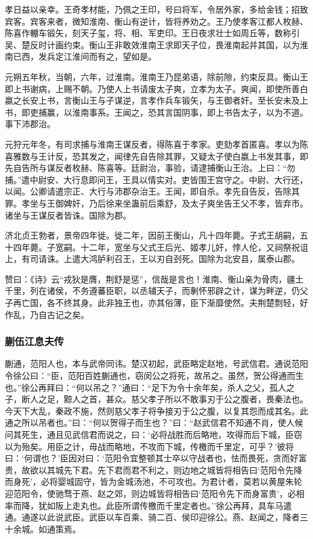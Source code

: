 \documentclass[]{article}
\begin{document}
孝日益以亲幸。王奇孝材能，乃佩之王印，号曰将军，令居外家，多给金钱；招致宾客。宾客来者，微知淮南、衡山有逆计，皆将养劝之。王乃使孝客江都人枚赫、陈喜作輣车锻矢，刻天子玺，将、相、军吏印。王日夜求壮士如周丘等，数称引吴、楚反时计画约束。衡山王非敢效淮南王求即天子位，畏淮南起并其国，以为淮南已西，发兵定江淮间而有之，望如是。

元朔五年秋，当朝，六年，过淮南。淮南王乃昆弟语，除前隙，约束反具。衡山王即上书谢病，上赐不朝。乃使人上书请废太子爽，立孝为太子。爽闻，即使所善白嬴之长安上书，言衡山王与子谋逆，言孝作兵车锻矢，与王御者奸。至长安未及上书，即吏捕赢，以淮南事系。王闻之，恐其言国阴事，即上书告太子，以为不道。事下沛郡治。

元狩元年冬，有司求捕与淮南王谋反者，得陈喜于孝家。吏劾孝首匿喜。孝以为陈喜雅数与王计反，恐其发之，闻律先自告除其罪，又疑太子使白嬴上书发其事，即先自告所与谋反者枚赫、陈喜等。廷尉治，事验，请逮捕衡山王治。上曰：``勿捕。''遣中尉安、大行息即问王，王具以情实对。吏皆围王宫守之。中尉、大行还，以闻。公卿请遣宗正、大行与沛郡杂治王。王闻，即自杀。孝先自告反，告除其罪。孝坐与王御婢奸，乃后徐来坐蛊前后乘舒，及太子爽坐告王父不孝，皆弃市。诸坐与王谋反者皆诛。国除为郡。

济北贞王勃者，景帝四年徙。徙二年，因前王衡山，凡十四年薨。子式王胡嗣，五十四年薨。子宽嗣。十二年，宽坐与父式王后光、姬孝儿奸，悖人伦，又祠祭祝诅上，有司请诛。上遣大鸿胪利召王，王以刃自刭死。国除为北安县，属泰山郡。

赞曰：《诗》云``戎狄是膺，荆舒是惩''，信哉是言也！淮南、衡山亲为骨肉，疆土千里，列在诸侯，不务遵蕃臣职，以丞辅天子，而剸怀邪辟之计，谋为畔逆，仍父子再亡国，各不终其身。此非独王也，亦其俗薄，臣下渐靡使然。夫荆楚剽轻，好作乱，乃自古记之矣。

\hypertarget{header-n3987}{%
\subsubsection{蒯伍江息夫传}\label{header-n3987}}

蒯通，范阳人也，本与武帝同讳。楚汉初起，武臣略定赵地，号武信君。通说范阳令徐公曰：``臣，范阳百姓蒯通也，窃闵公之将死，故吊之。虽然，贺公得通而生也。''徐公再拜曰：``何以吊之？''通曰：``足下为令十余年矣，杀人之父，孤人之子，断人之足，黥人之首，甚众。慈父孝子所以不敢事刃于公之腹者，畏秦法也。今天下大乱，秦政不施，然则慈父孝子将争接刃于公之腹，以复其怨而成其名。此通之所以吊者也。''曰：``何以贺得子而生也？''曰：``赵武信君不知通不肖，使人候问其死生，通且见武信君而说之，曰：`必将战胜而后略地，攻得而后下城，臣窃以为殆矣。用臣之计，毋战而略地，不攻而下城，传檄而千里定，可乎？'彼将曰：`何谓也？'臣因对曰：`范阳令宜整顿其士卒以守战者也，怯而畏死，贪而好富贵，故欲以其城先下君。先下君而君不利之，则边地之城皆将相告曰`范阳令先降而身死'，必将婴城固守，皆为金城汤池，不可攻也。为君计者，莫若以黄屋朱轮迎范阳令，使驰骛于燕、赵之郊，则边城皆将相告曰`范阳令先下而身富贵'，必相率而降，犹如阪上走丸也。此臣所谓传檄而千里定者也。''徐公再拜，具车马遣通。通遂以此说武臣。武臣以车百乘、骑二百、侯印迎徐公。燕、赵闻之，降者三十余城。如通策焉。
\end{document}
